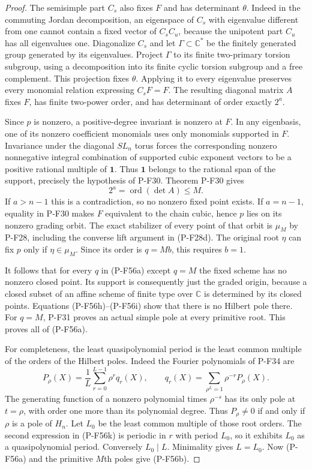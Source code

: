 \documentclass[11pt,a4paper]{article}
\begin{document}
\begin{proof}
The semisimple part $C_s$ also fixes $F$ and has determinant
$\theta$. Indeed in the commuting Jordan decomposition,
an eigenspace of $C_s$ with eigenvalue different from one
cannot contain a fixed vector of $C_sC_u$, because the
unipotent part $C_u$ has all eigenvalues one.
Diagonalize $C_s$ and let $\Gamma\subset\mathbb C^*$ be
the finitely generated group generated by its eigenvalues.
Project $\Gamma$ to its finite two-primary torsion subgroup,
using a decomposition into its finite cyclic torsion subgroup
and a free complement. This projection fixes $\theta$.
Applying it to every eigenvalue preserves every monomial
relation expressing $C_sF=F$.
The resulting diagonal matrix $A$ fixes $F$, has finite
two-power order, and has determinant of order exactly $2^a$.

Since $p$ is nonzero, a positive-degree invariant is nonzero
at $F$. In any eigenbasis, one of its nonzero coefficient
monomials uses only monomials supported in $F$.
Invariance under the diagonal $SL_n$ torus forces the
corresponding nonzero nonnegative integral combination of supported
cubic exponent vectors to be a positive rational multiple
of $\mathbf1$. Thus $\mathbf1$ belongs to the rational
span of the support, precisely the hypothesis of P-F30.
Theorem P-F30 gives
\[
                       2^a=\operatorname{ord}(\det A)\le M.
 \tag{P-F56j}
\]
If $a>n-1$ this is a contradiction, so no nonzero fixed
point exists. If $a=n-1$, equality in P-F30 makes $F$
equivalent to the chain cubic, hence $p$ lies on its
nonzero grading orbit. The exact stabilizer of every
point of that orbit is $\mu_M$ by P-F28, including the
converse lift argument in (P-F28d).
The original root $\eta$ can fix $p$ only if $\eta\in\mu_M$.
Since its order is $q=Mb$, this requires $b=1$.

It follows that for every $q$ in (P-F56a) except $q=M$
the fixed scheme has no nonzero closed point. Its support
is consequently just the graded origin, because a closed
subset of an affine scheme of finite type over $\mathbb C$
is determined by its closed points. Equations
(P-F56h)--(P-F56i) show that there is no Hilbert pole there.
For $q=M$, P-F31 proves an actual simple pole at every
primitive root. This proves all of (P-F56a).

For completeness, the least quasipolynomial period is the
least common multiple of the orders of the Hilbert poles.
Indeed the Fourier polynomials of P-F34 are
\[
 P_\rho(X)=\frac1L\sum_{r=0}^{L-1}\rho^r q_r(X),\qquad
 q_r(X)=\sum_{\rho^L=1}\rho^{-r}P_\rho(X).                 \tag{P-F56k}
\]
The generating function of a nonzero polynomial times
$\rho^{-s}$ has its only pole at $t=\rho$, with order
one more than its polynomial degree. Thus $P_\rho\ne0$
if and only if $\rho$ is a pole of $H_n$.
Let $L_0$ be the least common multiple of those root orders.
The second expression in (P-F56k) is periodic in $r$
with period $L_0$, so it exhibits $L_0$ as a quasipolynomial
period. Conversely $L_0\mid L$. Minimality gives $L=L_0$.
Now (P-F56a) and the primitive $M$th poles give (P-F56b).


\end{proof}
\end{document}

